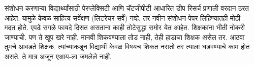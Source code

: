 संशोधन करणाऱ्या विद्यार्थ्यांसाठी पेरप्लेक्सिटी आणि चॅटजीपीटी आधारित डीप रिसर्च प्रणाली वरदान ठरत आहेत. यामुळे केवळ साहित्य सर्वेक्षण (लिटरेचर सर्वे) नव्हे, तर नवीन संशोधन पेपर लिहिण्यातही मोठी मदत होते. एवढे सगळे फायदे दिसत असताना काही तोटेसुद्धा समोर येत आहेत. शिक्षकांना भीती नोकरी जाण्याची. पण ते खूप खरे नाही. मानवी शिकवण्याला तोड नाही, तेही हाडाचा शिक्षक असेल तर. आठवा तुमचे आवडते शिक्षक. त्यांच्याकडून विद्यार्थी केवळ विषयच शिकत नसतो तर त्याला घडवण्याचे काम होत असते. ते मात्र अजून एआय-ला जमलेले नाही.